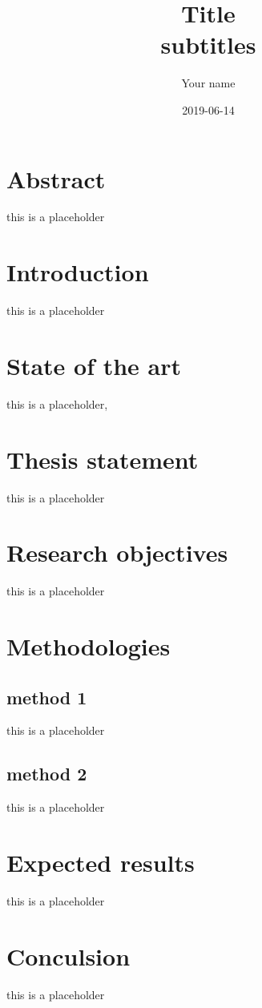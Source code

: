 \documentclass[a4paper,11pt]{article}
\author{Your name}
\date{2019-06-14}
\title{Title\\\medskip
\large subtitles}
\begin{document}
\maketitle
\tableofcontents





\section{Abstract}
\label{sec:org6a1f21d}

this is a placeholder

\section{Introduction}
\label{sec:org7ffe7a1}

this is a placeholder


\section{State of the art}
\label{sec:orgf44f951}

this is a placeholder, \cite{kao2017assembly}

\section{Thesis statement}
\label{sec:orgeb60d2f}

this is a placeholder

\section{Research objectives}
\label{sec:orgbbaf901}

this is a placeholder

\section{Methodologies}
\label{sec:orgb6a9827}

\subsection{method 1}
\label{sec:org25c6485}
this is a placeholder

\subsection{method 2}
\label{sec:org396d15e}
this is a placeholder


\section{Expected results}
\label{sec:org0d96db8}

this is a placeholder

\section{Conculsion}
\label{sec:org9fa8d5f}

this is a placeholder


\printbibliography
\end{document}
